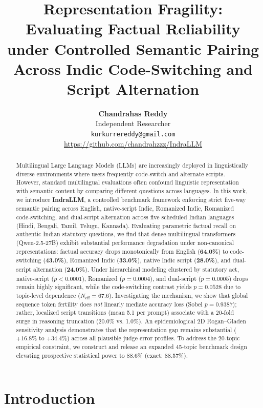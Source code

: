 \documentclass[11pt]{article}
\title{\textbf{Representation Fragility: Evaluating Factual Reliability under Controlled Semantic Pairing Across Indic Code-Switching and Script Alternation}}
\author{\textbf{Chandrahas Reddy} \\
  Independent Researcher \\
  \texttt{kurkurrereddy@gmail.com} \\
  \url{https://github.com/chandrahzzz/IndraLLM}
}
\date{}
\begin{document}
\maketitle

\begin{abstract}
Multilingual Large Language Models (LLMs) are increasingly deployed in linguistically diverse environments where users frequently code-switch and alternate scripts. However, standard multilingual evaluations often confound linguistic representation with semantic content by comparing different questions across languages. In this work, we introduce \textbf{IndraLLM}, a controlled benchmark framework enforcing strict five-way semantic pairing across English, native-script Indic, Romanized Indic, Romanized code-switching, and dual-script alternation across five scheduled Indian languages (Hindi, Bengali, Tamil, Telugu, Kannada). Evaluating parametric factual recall on authentic Indian statutory questions, we find that dense multilingual transformers (Qwen-2.5-27B) exhibit substantial performance degradation under non-canonical representations: factual accuracy drops monotonically from English (\textbf{64.0\%}) to code-switching (\textbf{43.0\%}), Romanized Indic (\textbf{33.0\%}), native Indic script (\textbf{28.0\%}), and dual-script alternation (\textbf{24.0\%}). Under hierarchical modeling clustered by statutory act, native-script ($p < 0.0001$), Romanized ($p = 0.0004$), and dual-script ($p = 0.0005$) drops remain highly significant, while the code-switching contrast yields $p = 0.0528$ due to topic-level dependence ($N_{\text{eff}} = 67.6$). Investigating the mechanism, we show that global sequence token fertility does \textit{not} linearly mediate accuracy loss (Sobel $p = 0.9387$); rather, localized script transitions (mean 5.1 per prompt) associate with a 20-fold surge in reasoning truncation (20.0\% vs. 1.0\%). An epidemiological 2D Rogan--Gladen sensitivity analysis demonstrates that the representation gap remains substantial ($+16.8\%$ to $+34.4\%$) across all plausible judge error profiles. To address the 20-topic empirical constraint, we construct and release an expanded 45-topic benchmark design elevating prospective statistical power to 88.6\% (exact: 88.57\%).
\end{abstract}

\section{Introduction}
\label{sec:intro}
\end{document}
